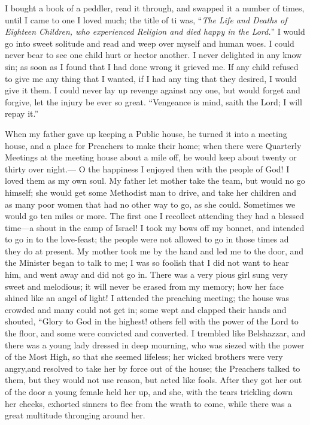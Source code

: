 I bought a book of a peddler, read it through, and swapped it a number of times, until I came to one I loved much; the title of ti was, ``\textit{The Life and Deaths of Eighteen Children, who experienced Religion and died happy in the Lord.}''
I would go into sweet solitude and read and weep over myself and human woes.
I could never bear to see one child hurt or hector another.
I never delighted in any know sin; as soon as I found that I had done wrong it grieved me.
If any child refused to give me any thing that I wanted, if I had any ting that they desired, I would give it them.
I could never lay up revenge against any one, but would forget and forgive, let the injury be ever so great.
``Vengeance is mind, saith the Lord; I will repay it.''

When my father gave up keeping a Public house, he turned it into a meeting house, and a place for Preachers to make their home; when there were Quarterly Meetings at the meeting house about a mile off, he would keep about twenty or thirty over night.---
O the happiness I enjoyed then with the people of God!
I loved them as my own soul.
My father let mother take the team, but would no go himself; she would get some Methodist man to drive, and take her children and as many poor women that had no other way to go, as she could.
Sometimes we would go ten miles or more.
The first one I recollect attending they had a blessed time---a shout in the camp of Israel!
I took my bows off my bonnet, and intended to go in to the love-feast; the people were not allowed to go in those times ad they do at present.
My mother took me by the hand and led me to the door, and the Minister began to talk to me; I was so foolish that I did not want to hear him, and went away and did not go in.
There was a very pious girl sung very sweet and melodious; it will never be erased from my memory; how her face shined like an angel of light!
I attended the preaching meeting; the house was crowded and many could not get in; some wept and clapped their hands and shouted, ``Glory to God in the  highest! others fell with the power of the Lord to the floor, and some were convicted and converted.
I trembled like Belshazzar, and there was a young lady dressed in deep mourning, who was siezed with the power of the Most High, so that she seemed lifeless; her wicked brothers were very angry,and resolved to take her by force out of the house; the Preachers talked to them, but they would not use reason, but acted like fools.
After they got her out of the door a young female held her up, and she, with the tears trickling down her cheeks, exhorted sinners to flee from the wrath to come, while there was a great multitude thronging around her.
